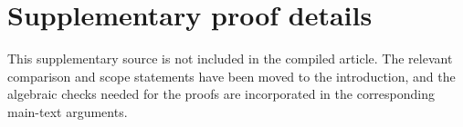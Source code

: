 \section{Supplementary proof details}\label{sec:audit-scope-comparison}

This supplementary source is not included in the compiled article.  The relevant comparison and scope statements have been moved to the introduction, and the algebraic checks needed for the proofs are incorporated in the corresponding main-text arguments.
